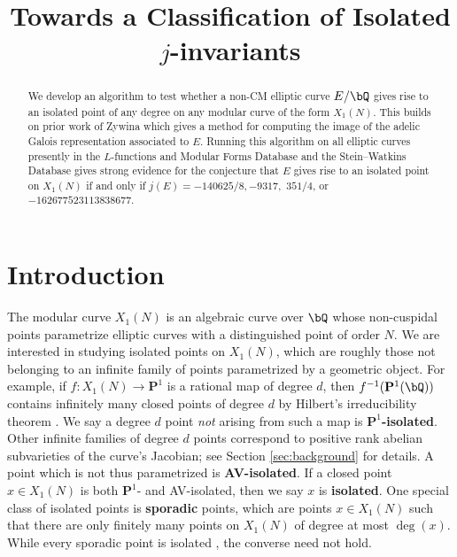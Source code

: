 \documentclass[11pt,reqno]{amsart}
\title{Towards a Classification of Isolated $j$-invariants}
\theoremstyle{plain}
\theoremstyle{definition}
\newcommand{\Q}{\bQ}
\newcommand{\PP}{\mathbf P}
\begin{document}
\maketitle

\begin{abstract}
We develop an algorithm to test whether a non-CM elliptic curve $E/\Q$ gives rise to an isolated point of any degree on any modular curve of the form $X_1(N)$. This builds on prior work of Zywina which gives a method for computing the image of the adelic Galois representation associated to $E$. Running this algorithm on all elliptic curves presently in the $L$-functions and Modular Forms Database and the Stein--Watkins Database gives strong evidence for the conjecture that $E$ gives rise to an isolated point on $X_1(N)$ if and only if $j(E)=-140625/8, -9317,$ $351/4$, or $-162677523113838677$.
\end{abstract}




\section{Introduction}
\label{sec:intro}


The modular curve $X_1(N)$ is an algebraic curve over $\Q$ whose non-cuspidal points parametrize elliptic curves with a distinguished point of order $N$. We are interested in studying isolated points on $X_1(N)$, which are roughly those not belonging to an infinite family of points parametrized by a geometric object. For example, if $f\colon X_1(N) \rightarrow \PP^1$ is a rational map of degree $d$, then $f^{-1}(\PP^1(\Q))$ contains infinitely many closed points of degree $d$ by Hilbert's irreducibility theorem \cite[Chapter~9]{serre97}. We say a degree $d$ point \emph{not} arising from such a map is \textbf{$\PP^1$-isolated}. Other infinite families of degree $d$ points correspond to positive rank abelian subvarieties of the curve's Jacobian; see Section \ref{sec:background} for details. A point which is not thus parametrized is \textbf{AV-isolated}. If a closed point $x\in X_1(N)$ is both $\PP^1$- and AV-isolated, then we say $x$ is \textbf{isolated}. One special class of isolated points is \textbf{sporadic} points, which are points $x \in X_1(N)$ such that there are only finitely many points on $X_1(N)$ of degree at most $\deg(x)$. While every sporadic point is isolated \cite[Theorem 4.2]{BELOV}, the converse need not hold.
\end{document}
